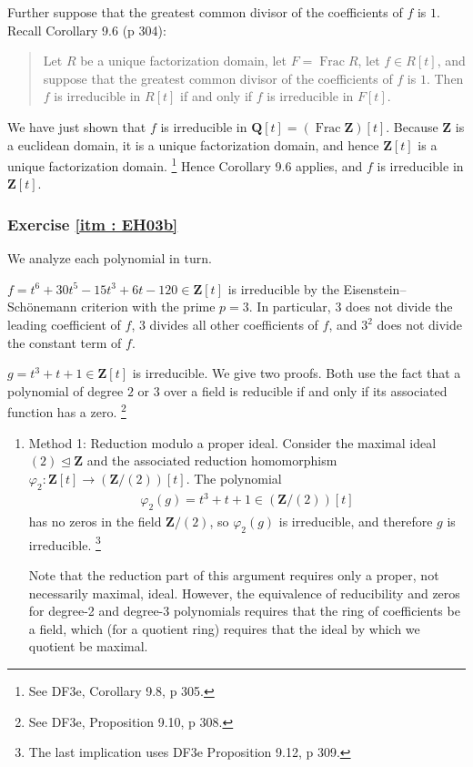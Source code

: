 \documentclass[oneside, english, 11pt]{article}
\DeclareMathOperator{\Frac}{Frac}
\newcommand{\idealeq}{\trianglelefteq}
\newcommand{\integers}{\mathbf{Z}}
\newcommand{\Q}{\rationals}
\newcommand{\rationals}{\mathbf{Q}}
\newcommand{\Z}{\integers}
\begin{document}
{Further suppose that the greatest common divisor of the coefficients of $f$ is $1$. Recall Corollary 9.6 (p 304):
\begin{quote}
Let $R$ be a unique factorization domain, let $F = \Frac R$, let $f \in R[t]$, and suppose that the greatest common divisor of the coefficients of $f$ is $1$. Then $f$ is irreducible in $R[t]$ if and only if $f$ is irreducible in $F[t]$.
\end{quote}
We have just shown that $f$ is irreducible in $\Q[t] = (\Frac \Z)[t]$. Because $\Z$ is a euclidean domain, it is a unique factorization domain, and hence $\Z[t]$ is a unique factorization domain.%
\footnote{See DF3e, Corollary 9.8, p 305.} %
Hence Corollary 9.6 applies, and $f$ is irreducible in $\Z[t]$. 



\subsubsection*{Exercise \ref{itm : EH03b}}

We analyze each polynomial in turn.

$f = t^{6} + 30 t^{5} - 15 t^{3} + 6 t - 120 \in \Z[t]$ is irreducible by the Eisenstein--Sch\"{o}nemann criterion with the prime $p = 3$. In particular, $3$ does not divide the leading coefficient of $f$, $3$ divides all other coefficients of $f$, and $3^{2}$ does not divide the constant term of $f$.

$g = t^{3} + t + 1 \in \Z[t]$ is irreducible. We give two proofs. Both use the fact that a polynomial of degree $2$ or $3$ over a field is reducible if and only if its associated function has a zero.%
\footnote{See DF3e, Proposition 9.10, p 308.}%
\begin{enumerate}
\item Method 1: Reduction modulo a proper ideal. Consider the maximal ideal $(2) \idealeq \Z$ and the associated reduction homomorphism $\varphi_{2} : \Z[t] \rightarrow (\Z / (2))[t]$. The polynomial
\begin{align*}
\varphi_{2}(g)
=
t^{3} + t + 1
\in
(\Z / (2))[t]
\end{align*}
has no zeros in the field $\Z / (2)$, so $\varphi_{2}(g)$ is irreducible, and therefore $g$ is irreducible.%
\footnote{The last implication uses DF3e Proposition 9.12, p 309.}%

Note that the reduction part of this argument requires only a proper, not necessarily maximal, ideal. However, the equivalence of reducibility and zeros for degree-2 and degree-3 polynomials requires that the ring of coefficients be a field, which (for a quotient ring) requires that the ideal by which we quotient be maximal.


\end{enumerate}}
\end{document}
